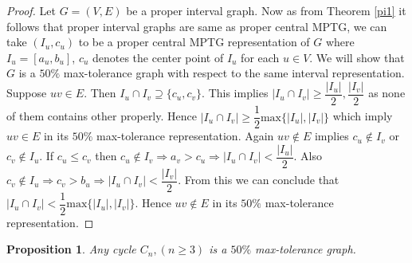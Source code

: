 \documentclass{article}
\newtheorem{prop}[thm]{Proposition}
\theoremstyle{definition}
\numberwithin{equation}{section}
\begin{document}
\begin{proof}
Let $G=(V,E)$ be a proper interval graph. Now as from Theorem \ref{pi1} it follows that proper interval graphs are same as proper central MPTG, we can take $(I_{u},c_{u})$ to be a proper central MPTG representation of $G$ where $I_{u}=[a_{u},b_{u}]$, $c_{u}$ denotes the center point of $I_{u}$ for each $u\in V$. We will show that $G$ is a $50\%$ max-tolerance graph with respect to the same interval representation. Suppose $uv\in E$. Then $I_{u}\cap I_{v}\supseteq \{c_{u},c_{v}\}$. This implies $|I_{u}\cap I_{v}|\geq \dfrac{|I_{u}|}{2}, \dfrac{|I_{v}|}{2}$ as none of them contains other properly. Hence $|I_{u}\cap I_{v}|\geq \dfrac{1}{2} \text{max}\{|I_{u}|,|I_{v}|\}$ which imply $uv\in E$ in its $50\%$ max-tolerance representation. Again $uv\notin E$ implies $c_{u}\notin I_{v}$ or $c_{v}\notin I_{u}$. If $c_{u}\leq c_{v}$ then $c_{u}\notin I_{v} \Rightarrow a_{v}>c_{u}\Rightarrow |I_{u}\cap I_{v}|<\dfrac{|I_{u}|}{2}$. Also $c_{v}\notin I_{u}\Rightarrow c_{v}>b_{u}\Rightarrow |I_{u}\cap I_{v}|<\dfrac{|I_{v}|}{2}$. From this we can conclude that $|I_{u}\cap I_{v}|<\dfrac{1}{2} \text{max}\{|I_{u}|,|I_{v}|\}$. Hence $uv\notin E$ in its $50\%$ max-tolerance representation.
\end{proof}


\begin{prop}\label{c60}
Any cycle $C_{n},(n\geq 3)$ is a $50\%$ max-tolerance graph.
\end{prop}
\end{document}

